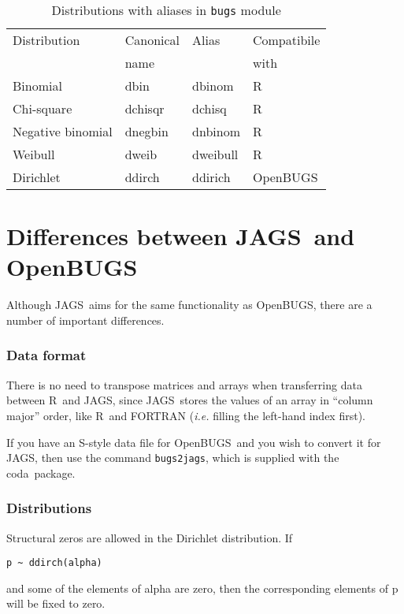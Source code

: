 \documentclass[11pt, a4paper, titlepage]{report}
\newcommand{\JAGS}{\textsf{JAGS}}
\newcommand{\OpenBUGS}{\textsf{OpenBUGS}}
\newcommand{\R}{\textsf{R}}
\newcommand{\CODA}{\textsf{coda}}
\begin{document}
\begin{table}
\begin{center}
\begin{tabular}{llll}
\hline
Distribution & Canonical & Alias & Compatibile  \\
             & name      &       & with         \\
\hline
Binomial           & dbin      & dbinom   & R   \\
Chi-square         & dchisqr   & dchisq   & R   \\ 
Negative binomial  & dnegbin   & dnbinom  & R   \\
Weibull            & dweib     & dweibull & R   \\ 
Dirichlet          & ddirch    & ddirich  & OpenBUGS \\
\hline
\end{tabular}
\caption{Distributions with aliases in \texttt{bugs} module
  \label{table:bugs:distributions:alias}}
\end{center}
\end{table}

\chapter{Differences between \JAGS\ and \OpenBUGS}

Although \JAGS\ aims for the same functionality as \OpenBUGS, there are
a number of important differences.

\subsection{Data format}

There is no need to transpose matrices and arrays when transferring
data between \R\ and \JAGS, since \JAGS\ stores the values of an array
in ``column major'' order, like \R\ and FORTRAN ({\em i.e.} filling
the left-hand index first).

If you have an \textsf{S}-style data file for \OpenBUGS\ and you wish
to convert it for \JAGS, then use the command \texttt{bugs2jags},
which is supplied with the \CODA\ package.

\subsection{Distributions}

Structural zeros are allowed in the Dirichlet distribution. If
\begin{verbatim}
p ~ ddirch(alpha)
\end{verbatim}
and some of the elements of alpha are zero, then the corresponding
elements of p will be fixed to zero.
\end{document}
